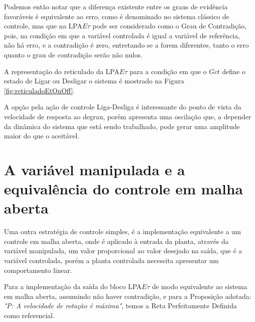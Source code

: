 




Podemos então notar que 
a diferença existente entre os graus de evidência favoráveis 
é equivalente ao erro, 
como é denominado no sistema clássico de controle, 
mas que na LPA$E\tau$ pode ser considerado como 
o Grau de Contradição, pois,
na condição em que a variável controlada é igual a 
variável de referência, não há erro, e a contradição é zero, 
entretando se a forem diferentes, 
tanto o erro quanto o grau de contradição
serão não nulos. 

A representação do reticulado da LPA$E\tau$ 
para a condição em que o $Gct$ define o estado
de Ligar ou Desligar o sistema é mostrado na 
Figura \ref{fig:reticuladoEtOnOff}.

A opção pela ação de controle Liga-Desliga
é interessante do ponto de vista da velocidade 
de resposta ao degrau, 
porém apresenta uma oscilação que, 
a depender da dinâmica do sistema que está sendo trabalhado,
pode gerar uma amplitude maior do que o aceitável.











\section{A variável manipulada e a equivalência do controle em malha aberta}

Uma outra estratégia de controle simples, 
é a implementação equivalente a um controle em malha aberta,
onde é aplicado à entrada da planta, 
através da variável manipulada,
um valor proporcional ao valor desejado na saída,
que é a variável controlada, 
porém a planta controlada necessita apresentar um 
comportamento linear. 

Para a implementação da saída do bloco 
LPA$E\tau$ de modo equivalente ao sistema em malha aberta,
assumindo não haver contradição, 
e para a Proposição adotada: 
\emph{"P: A velocidade de rotação é máxima"}, 
temos a Reta Perfeitamente Definida como referencial. 

